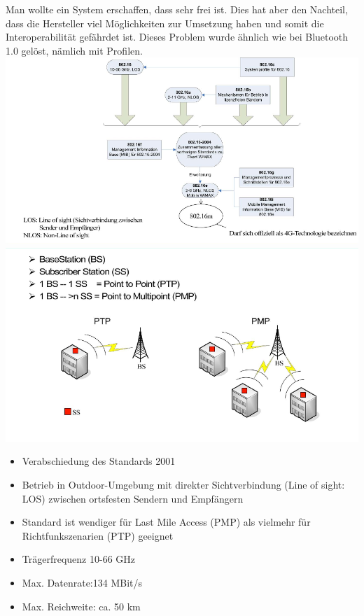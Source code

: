 Man wollte ein System erschaffen, dass sehr frei ist. Dies hat aber den Nachteil, dass die Hersteller viel Möglichkeiten zur Umsetzung haben und somit die Interoperabilität gefährdet ist. Dieses Problem wurde ähnlich wie bei Bluetooth 1.0 gelöst, nämlich mit Profilen. \\
\includegraphics[width = 0.75 \linewidth]{./pics/wimax1.png} \\
\includegraphics[width = 0.75 \linewidth]{./pics/wimax2.png} \\

\begin{itemize}
\item Verabschiedung des Standards 2001
\item Betrieb in Outdoor-Umgebung mit direkter Sichtverbindung (Line of sight: LOS) zwischen ortsfesten Sendern und Empfängern
\item Standard ist wendiger für Last Mile Access (PMP) als vielmehr für Richtfunkszenarien (PTP) geeignet
\item Trägerfrequenz 10-66 GHz
\item Max. Datenrate:134 MBit/s
\item Max. Reichweite: ca. 50 km
\end{itemize}


